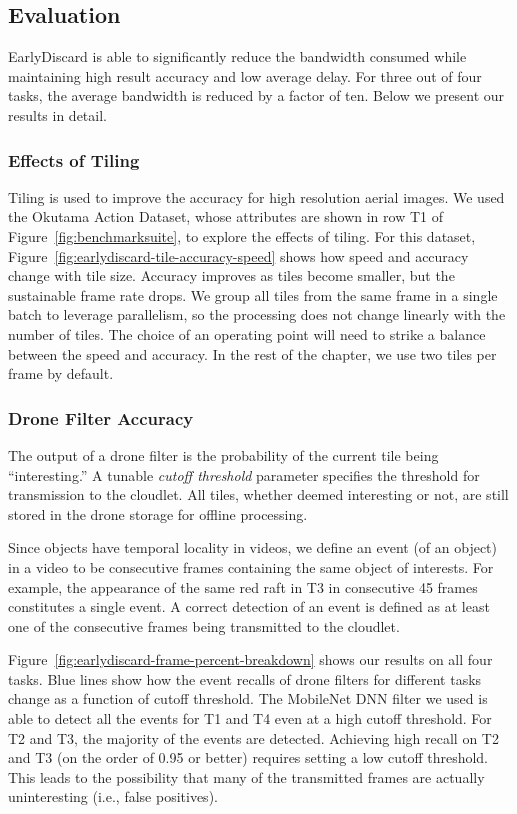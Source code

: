 \subsection{Evaluation}
\label{sec:earlydiscard-result}

EarlyDiscard is able to significantly reduce the bandwidth consumed while
maintaining high result accuracy and low average delay. For three out of four
tasks, the average bandwidth is reduced by a factor of ten. Below we present
our results in detail.

\subsubsection{Effects of Tiling}
Tiling is used to improve the accuracy
for high resolution aerial images. We used the Okutama Action Dataset, whose
attributes are shown in row T1 of Figure~\ref{fig:benchmarksuite}, to explore
the effects of tiling.  For this dataset,
Figure~\ref{fig:earlydiscard-tile-accuracy-speed} shows how speed and accuracy
change with tile size.  Accuracy improves as tiles become smaller, but the
sustainable frame rate drops.  We group all tiles from the same frame in a
single batch to leverage parallelism, so the processing does not change linearly
with the number of tiles. The choice of an operating point will need to strike a
balance between the speed and accuracy.  In the rest of the chapter, we use two
tiles per frame by default. 

\subsubsection{Drone Filter Accuracy}
The output of a drone filter is the
probability of the current tile being ``interesting.''  A tunable {\em cutoff
threshold} parameter specifies the threshold for transmission to the cloudlet.
All tiles, whether deemed interesting or not, are still stored in the drone
storage for offline processing.

Since objects have temporal locality in videos, we define an event (of an
object) in a video to be consecutive frames containing the same object of
interests. For example, the appearance of the same red raft in T3 in consecutive
45 frames constitutes a single event. A correct detection of an event is defined
as at least one of the consecutive frames being transmitted to the cloudlet.  

Figure~\ref{fig:earlydiscard-frame-percent-breakdown} shows our results on all
four tasks. Blue lines show how the event recalls of drone filters for different
tasks change as a function of cutoff threshold. The MobileNet DNN filter we used
is able to detect all the events for T1 and T4 even at a high cutoff threshold.
For T2 and T3, the majority of the events are detected. Achieving high recall on
T2 and T3 (on the order of 0.95 or better) requires setting a low cutoff
threshold.  This leads to the possibility that many of the transmitted frames
are actually uninteresting (i.e., false positives).

